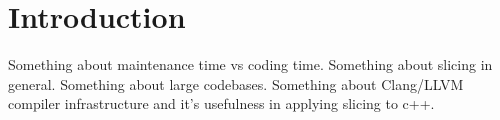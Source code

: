 \documentclass[oneside,12pt,a4paper]{book}
\begin{document}
\chapter{Introduction}
Something about maintenance time vs coding time. 
Something about slicing in general.
Something about large codebases.
Something about Clang/LLVM compiler infrastructure and it's usefulness in applying slicing to c++.

\begin{thebibliography}{Textttext}
\end{thebibliography}
\end{document}
